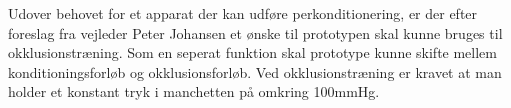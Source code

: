 Udover behovet for et apparat der kan udføre perkonditionering, er der efter foreslag fra vejleder Peter Johansen et ønske til prototypen skal kunne bruges til okklusionstræning. Som en seperat funktion skal prototype kunne skifte mellem konditioningsforløb og okklusionsforløb. Ved okklusionstræning er kravet at man holder et konstant tryk i manchetten på omkring 100mmHg. 

